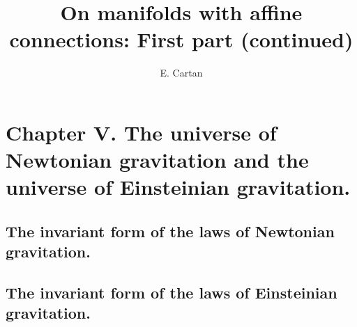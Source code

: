 \documentclass{report}
\title{On manifolds with affine connections: First part (continued)}
\author{E. Cartan}
\begin{document}
\maketitle

\chapter*{Chapter V. The universe of Newtonian gravitation and the universe of Einsteinian gravitation.}
\section*{The invariant form of the laws of Newtonian gravitation.}








\section*{The invariant form of the laws of Einsteinian gravitation.}




\end{document}
